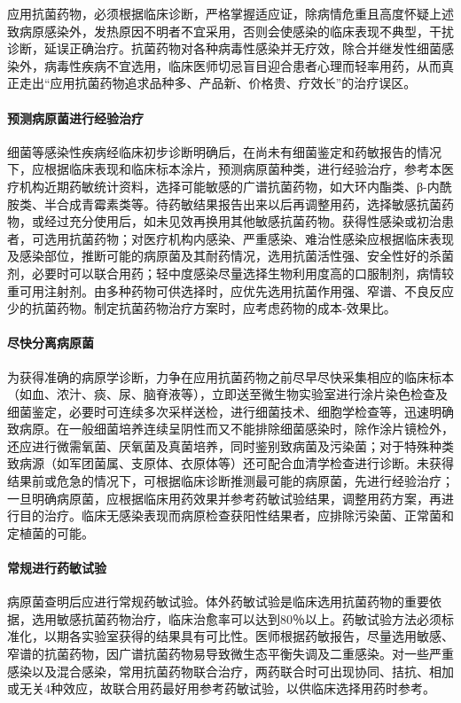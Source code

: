 应用抗菌药物，必须根据临床诊断，严格掌握适应证，除病情危重且高度怀疑上述致病原感染外，发热原因不明者不宜采用，否则会使感染的临床表现不典型，干扰诊断，延误正确治疗。抗菌药物对各种病毒性感染并无疗效，除合并继发性细菌感染外，病毒性疾病不宜选用，临床医师切忌盲目迎合患者心理而轻率用药，从而真正走出“应用抗菌药物追求品种多、产品新、价格贵、疗效长”的治疗误区。
\paragraph{预测病原菌进行经验治疗}

细菌等感染性疾病经临床初步诊断明确后，在尚未有细菌鉴定和药敏报告的情况下，应根据临床表现和临床标本涂片，预测病原菌种类，进行经验治疗，参考本医疗机构近期药敏统计资料，选择可能敏感的广谱抗菌药物，如大环内酯类、β-内酰胺类、半合成青霉素类等。待药敏结果报告出来以后再调整用药，选择敏感抗菌药物，或经过充分使用后，如未见效再换用其他敏感抗菌药物。获得性感染或初治患者，可选用抗菌药物；对医疗机构内感染、严重感染、难治性感染应根据临床表现及感染部位，推断可能的病原菌及其耐药情况，选用抗菌活性强、安全性好的杀菌剂，必要时可以联合用药；轻中度感染尽量选择生物利用度高的口服制剂，病情较重可用注射剂。由多种药物可供选择时，应优先选用抗菌作用强、窄谱、不良反应少的抗菌药物。制定抗菌药物治疗方案时，应考虑药物的成本-效果比。
\paragraph{尽快分离病原菌}

为获得准确的病原学诊断，力争在应用抗菌药物之前尽早尽快采集相应的临床标本（如血、浓汁、痰、尿、脑脊液等），立即送至微生物实验室进行涂片染色检查及细菌鉴定，必要时可连续多次采样送检，进行细菌技术、细胞学检查等，迅速明确致病原。在一般细菌培养连续呈阴性而又不能排除细菌感染时，除作涂片镜检外，还应进行微需氧菌、厌氧菌及真菌培养，同时鉴别致病菌及污染菌；对于特殊种类致病源（如军团菌属、支原体、衣原体等）还可配合血清学检查进行诊断。未获得结果前或危急的情况下，可根据临床诊断推测最可能的病原菌，先进行经验治疗；一旦明确病原菌，应根据临床用药效果并参考药敏试验结果，调整用药方案，再进行目的治疗。临床无感染表现而病原检查获阳性结果者，应排除污染菌、正常菌和定植菌的可能。
\paragraph{常规进行药敏试验}

病原菌查明后应进行常规药敏试验。体外药敏试验是临床选用抗菌药物的重要依据，选用敏感抗菌药物治疗，临床治愈率可以达到80％以上。药敏试验方法必须标准化，以期各实验室获得的结果具有可比性。医师根据药敏报告，尽量选用敏感、窄谱的抗菌药物，因广谱抗菌药物易导致微生态平衡失调及二重感染。对一些严重感染以及混合感染，常用抗菌药物联合治疗，两药联合时可出现协同、拮抗、相加或无关4种效应，故联合用药最好用参考药敏试验，以供临床选择用药时参考。


